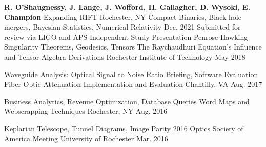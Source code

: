 \begin{cventries}

 \cventry
  {\textbf{R. O'Shaugnessy, J. Lange, J. Wofford, H. Gallagher, D. Wysoki, E. Champion}}
    {Expanding RIFT}
    {Rochester, NY}
    {Compact Binaries, Black hole mergers, Bayesian Statistics, Numerical Relativity }
    {Dec. 2021 Submitted for review via LIGO and APS
    }
\cventry
   {Independent Study Presentation Penrose-Hawking Singularity Theorems, Geodesics, Tensors}
{The Raychaudhuri Equation's Influence and Tensor Algebra Derivations}
   {Rochester Institute of Technology}
   {May 2018}
   {
   }

 \cventry
    {Waveguide Analysis: Optical Signal to Noise Ratio Briefing, Software Evaluation}
    {Fiber Optic Attenuation Implementation and Evaluation}
    {Chantilly, VA}
    {Aug. 2017}
    {
    }


 \cventry
    {Business Analytics, Revenue Optimization, Database Queries}
    {Word Maps and Webscrapping Techniques}
    {Rochester, NY}
    {Aug. 2016}
    {
    }

 \cventry
    {Keplarian Telescope, Tunnel Diagrams, Image Parity}
    {2016 Optics Society of America Meeting}
    {University of Rochester}
    {Mar. 2016}
    {
    }    

    
  
\end{cventries}
